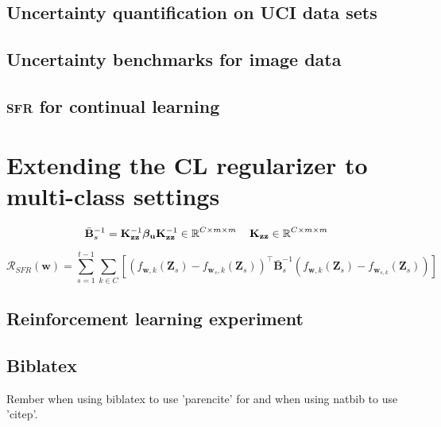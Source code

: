 \documentclass{article}
\newcommand{\our}{\textsc{sfr}\xspace}
\newcommand{\mathbold}[1]{\bm{#1}}
\newcommand{\mbf}[1]{\mathbf{#1}}
\newcommand{\MB}{\mbf{B}}
\newcommand{\MZ}{\mbf{Z}}
\newcommand{\T}{\top}
\newcommand{\vbeta}[0]{\mathbold{\beta}}
\newcommand{\vu}{\mbf{u}}
\newcommand{\vw}{\mbf{w}}
\newcommand{\MKzz}{\mbf{K}_{\mbf{z}\mbf{z}}}
\begin{document}
\subsection{Uncertainty quantification on UCI data sets}
\label{app:uci}



\subsection{Uncertainty benchmarks for image data}
\label{app:image}


\subsection{\our for continual learning}
\label{app:cl-exp}


\section{Extending the CL regularizer to multi-class settings}
\label{sec:cl_multioutput}
\begin{equation}
	\bar{\MB}^{-1}_s = \MKzz^{-1} \vbeta_\vu \MKzz^{-1} \in \R^{C \times m \times m} \quad \MKzz \in \R^{C \times m \times m} 
\end{equation}

\begin{equation}
	\mathcal{R_\textit{SFR}}(\mathbf{w}) = \sum_{s=1}^{t-1}	\sum_{k \in 	C}\left[\left(f_{\vw, k}(\MZ_{s}) - f_{\vw_{s}, k}(\MZ_s) \right)^\T \bar{\MB}^{-1}_{s} \left(f_{\vw, k}(\MZ_{s}) - f_{\vw_{s, k}}(\MZ_s) \right) \right] 
\end{equation}


\subsection{Reinforcement learning experiment}
\label{app:rl-experiment}





%    

\subsection{Biblatex}
Rember when using biblatex to use 'parencite' for \citep{kamtheDataEfficient2018} and when using natbib to use 'citep'.

%
\end{document}
